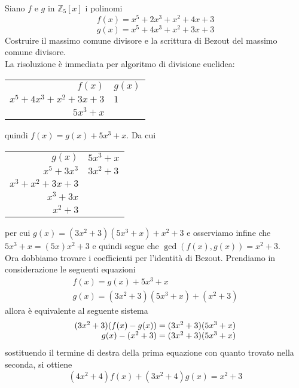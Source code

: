 \begin{esercizio}
	Siano $f$ e $g$ in $\mathbb{Z}_5[x]$ i polinomi 
	\begin{equation*}
	f(x)=x^5+2x^3+x^2+4x+3
	\end{equation*}
	\begin{equation*}
	g(x)=x^5+4x^3+x^2+3x+3
	\end{equation*}
	Costruire il massimo comune divisore e la scrittura di Bezout del massimo comune divisore.\\
	
	La risoluzione è immediata per algoritmo di divisione euclidea:
	\begin{center}
		\begin{tabular}{r|r}
			$f(x)$ & \multicolumn{1}{l}{$g(x)$}  \\ 
			\cline{2-2}
			$x^5+4x^3+x^2+3x+3$      & \multicolumn{1}{l}{$1$}    \\ 
			\cline{1-1}
			$5x^3+x$    &                              
		\end{tabular}
	\end{center}
	quindi $f(x) = g(x) + 5x^3+x$. Da cui 
	\begin{center}
		\begin{tabular}{r|r}
			$g(x)$ & \multicolumn{1}{l}{$5x^3+x$}  \\ 
			\cline{2-2}
			$x^5+3x^3$      & \multicolumn{1}{l}{$3x^2+3$}    \\ 
			\cline{1-1}
			$x^3+x^2+3x+3$    &  \\
			$x^3+3x$ & \\
			\cline{1-1} 
			$x^2+3$ &                      
		\end{tabular}
	\end{center}
	per cui $g(x) = (3x^2+3)(5x^3+x) + x^2+3$ e osserviamo infine che $5x^3+x = (5x)x^2+3$ 
	e quindi segue che $\gcd(f(x),g(x)) = x^2+3$.\\
	
	Ora dobbiamo trovare i coefficienti per l'identità di Bezout. Prendiamo in considerazione 
	le seguenti equazioni 
	\begin{equation*}
		\begin{array}{l}
			f(x)= g(x) + 5x^3+x  \\
			g(x)= (3x^2+3)(5x^3+x) + (x^2+3) 
		\end{array}
	\end{equation*}
	allora è equivalente al seguente sistema
	\begin{equation*}
		\arraycolsep=1.4pt
		\begin{array}{rl}
			(3x^2+3)(f(x)-g(x)) &= (3x^2+3)(5x^3+x)  \\
			g(x) - (x^2+3) &= (3x^2+3)(5x^3+x)  
		\end{array}
	\end{equation*}
	sostituendo il termine di destra della prima equazione con quanto trovato nella seconda, 
	si ottiene 
	\begin{equation*}
		(4x^2+4)f(x) + (3x^2+4)g(x) = x^2 + 3
	\end{equation*}
\end{esercizio}
